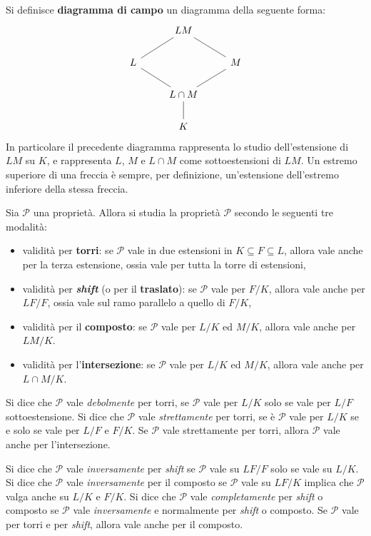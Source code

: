 \documentclass[10pt,landscape]{article}
\begin{document}
\begin{multicols}{3}
		
		Si definisce \textbf{diagramma di campo} un
		diagramma della seguente forma:
		\[\begin{tikzcd}
			& LM \\
			L & {} & M \\
			& {L \cap M} \\
			& K
			\arrow[no head, from=4-2, to=3-2]
			\arrow[no head, from=3-2, to=2-1]
			\arrow[no head, from=2-1, to=1-2]
			\arrow[no head, from=3-2, to=2-3]
			\arrow[no head, from=2-3, to=1-2]
		\end{tikzcd}\]
		In particolare il precedente diagramma rappresenta
		lo studio dell'estensione di $LM$ su $K$, e
		rappresenta $L$, $M$ e $L \cap M$ come sottoestensioni
		di $LM$. Un estremo superiore di una freccia è sempre,
		per definizione, un'estensione dell'estremo inferiore
		della stessa freccia. \medskip
		
		
		Sia $\mathcal{P}$ una proprietà. Allora si
		studia la proprietà $\mathcal{P}$ secondo
		le seguenti tre modalità:
		\begin{itemize}
			\item validità per \textbf{torri}: se $\mathcal{P}$ vale in due estensioni in $K \subseteq F \subseteq L$, allora vale anche per la terza estensione, ossia
			vale per tutta la torre di estensioni,
			\item validità per \textbf{\textit{shift}} (o per il \textbf{traslato}): se $\mathcal{P}$ vale
			per $F / K$, allora vale anche per $LF / F$, ossia
			vale sul ramo parallelo a quello di $F / K$,
			\item validità per il \textbf{composto}: se
			$\mathcal{P}$ vale per $L / K$ ed $M / K$, allora
			vale anche per $LM / K$.
			\item validità per l'\textbf{intersezione}:
			se $\mathcal{P}$ vale per $L / K$ ed $M / K$,
			allora vale anche per $L \cap M / K$.
		\end{itemize}
		Si dice che $\mathcal{P}$ vale \textit{debolmente}
		per torri, se $\mathcal{P}$ vale per $L / K$ solo
		se vale per $L / F$ sottoestensione.
		Si dice che $\mathcal{P}$ vale \textit{strettamente}
		per torri, se è $\mathcal{P}$ vale per $L / K$ se
		e solo se vale per $L / F$ e $F / K$. Se $\mathcal{P}$ vale strettamente per torri, allora $\mathcal{P}$
		vale anche per l'intersezione. \medskip
		
		
		Si dice che
		$\mathcal{P}$ vale \textit{inversamente} per
		\textit{shift} se $\mathcal{P}$ vale su
		$LF / F$ solo se vale su $L / K$. Si dice che
		$\mathcal{P}$ vale \textit{inversamente} per
		il composto se $\mathcal{P}$ vale su $LF / K$
		implica che $\mathcal{P}$ valga anche su $L / K$
		e $F / K$. Si dice che $\mathcal{P}$ vale \textit{completamente} per \textit{shift} o composto se $\mathcal{P}$
		vale \textit{inversamente} e normalmente per \textit{shift} o
		composto. Se $\mathcal{P}$ vale per torri e
		per \textit{shift}, allora vale anche per il
		composto.
		

\end{multicols}
\end{document}
